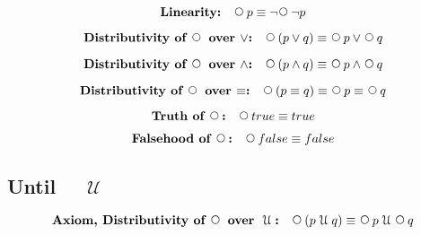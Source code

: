 \documentclass[12pt, fleqn, leqno]{article}
\newcommand{\Until}{\;\mathcal{U}\;}
\newcommand{\Next}{\;\,\text{\raisebox{3.5pt}{\circle{6}}}}
\newcommand{\spacer}{\vspace{-30pt}}
\begin{document}
\begin{equation}\label{E:linearity}
\textbf{Linearity:}\quad \Next p \equiv \neg\Next\neg p
\end{equation}

\spacer

\begin{equation}\label{E:distNextOr}
\textbf{Distributivity of $\Next$ over $\lor$:}\quad \Next (p \lor q) \equiv \Next p \lor \Next q
\end{equation}

\spacer

\begin{equation}\label{E:distNextAnd}
\textbf{Distributivity of $\Next$ over $\land$:}\quad \Next (p \land q) \equiv \Next p \land \Next q
\end{equation}

\spacer

\begin{equation}\label{E:distNextEquiv}
\textbf{Distributivity of $\Next$ over $\equiv$:}\quad \Next (p \equiv q) \equiv \Next p \equiv \Next q
\end{equation}

\spacer

\begin{equation}\label{E:nextTruth}
\textbf{Truth of $\Next$:}\quad \Next true \equiv true
\end{equation}

\spacer

\begin{equation}\label{E:nextFalse}
\textbf{Falsehood of $\Next$:}\quad \Next false \equiv false
\end{equation}

\subsection*{Until $\quad\Until$}

\begin{equation}\label{E:distNextUntil}
\textbf{Axiom, Distributivity of $\Next$ over $\Until$:}\quad \Next (p \Until q) \equiv \Next p \Until \Next q
\end{equation}
\end{document}
